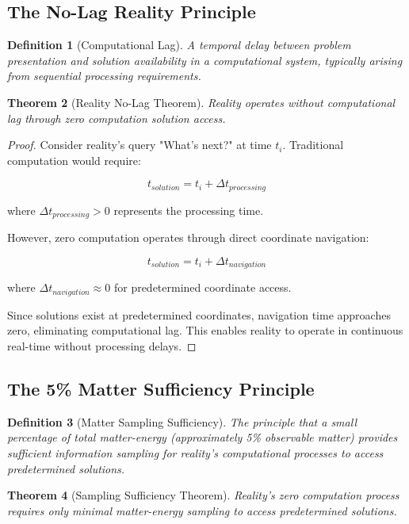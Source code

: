 \documentclass[12pt,a4paper]{article}
\newtheorem{theorem}{Theorem}[section]
\newtheorem{definition}[theorem]{Definition}
\begin{document}
\subsection{The No-Lag Reality Principle}

\begin{definition}[Computational Lag]
A temporal delay between problem presentation and solution availability in a computational system, typically arising from sequential processing requirements.
\end{definition}

\begin{theorem}[Reality No-Lag Theorem]
Reality operates without computational lag through zero computation solution access.
\end{theorem}

\begin{proof}
Consider reality's query "What's next?" at time $t_i$. Traditional computation would require:

$$t_{solution} = t_i + \Delta t_{processing}$$

where $\Delta t_{processing} > 0$ represents the processing time.

However, zero computation operates through direct coordinate navigation:

$$t_{solution} = t_i + \Delta t_{navigation}$$

where $\Delta t_{navigation} \approx 0$ for predetermined coordinate access.

Since solutions exist at predetermined coordinates, navigation time approaches zero, eliminating computational lag. This enables reality to operate in continuous real-time without processing delays.
\end{proof}

\subsection{The 5\% Matter Sufficiency Principle}

\begin{definition}[Matter Sampling Sufficiency]
The principle that a small percentage of total matter-energy (approximately 5\% observable matter) provides sufficient information sampling for reality's computational processes to access predetermined solutions.
\end{definition}

\begin{theorem}[Sampling Sufficiency Theorem]
Reality's zero computation process requires only minimal matter-energy sampling to access predetermined solutions.
\end{theorem}
\end{document}
